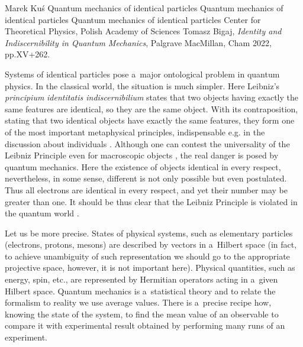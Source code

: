 \begin{newrevengenv}{Marek Kuś}
	{Quantum mechanics of identical particles}
	{Quantum mechanics of identical particles}
	{Quantum mechanics of identical particles}
	{Center for Theoretical Physics, Polish Academy of Sciences}
	{Tomasz Bigaj, \textit{Identity and Indiscernibility in Quantum Mechanics}, Palgrave MacMillan, Cham 2022, pp.XV+262.}





\lettrine[loversize=0.13,lines=2,lraise=-0.01,nindent=0em,findent=0.2pt]%
{S}{}ystems of identical particles pose a~major ontological problem in quantum physics. In the classical world, the situation is much simpler. Here Leibniz's \textit{principium} \textit{identitatis indiscernibilium} states that two objects having exactly the same features are identical, so they are the same object. With its contraposition, stating that two identical objects have exactly the same features, they form one of the most important metaphysical principles, indispensable e.g. in the discussion about individuals
\parencite[][]{guay_individuals_2016}. %
 Although one can contest the universality of the Leibniz Principle even for macroscopic objects 
\parencite[][]{black_identity_1952}, %
 the real danger is posed by quantum mechanics. Here the existence of objects identical in every respect, nevertheless, in some sense, different is not only possible but even postulated. Thus all electrons are identical in every respect, and yet their number may be greater than one. It should be thus clear that the Leibniz Principle is violated in the quantum world 
\parencites[][]{cortes_leibnizs_1976}[][]{ginsberg_quantum_1981}[][]{french_quantum_1988}[][]{castellani_leibnizs_2000}.%


Let us be more precise. States of physical systems, such as elementary particles (electrons, protons, mesons) are described by vectors in a~Hilbert space (in fact, to achieve unambiguity of such representation we should go to the appropriate projective space, however, it is not important here). Physical quantities, such as energy, spin, etc., are represented by Hermitian operators acting in a~given Hilbert space. Quantum mechanics is a~statistical theory and to relate the formalism to reality we use average values. There is a~precise recipe how, knowing the state of the system, to find the mean value of an observable to compare it with experimental result obtained by performing many runs of an experiment.


\end{newrevengenv}
